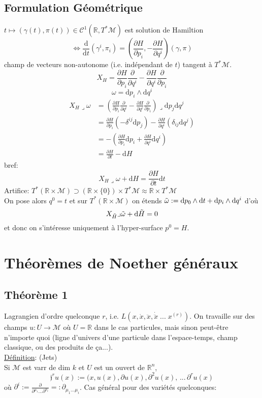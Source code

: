 \documentclass[a4paper,11pt]{article}
\renewcommand{\d}{{\mathrm{d}}}
\newcommand{\dr}[2]{\frac{\partial {#1}}{\partial{#2}}}
\begin{document}
\subsection{Formulation Géométrique}
$t\mapsto (\gamma(t), \pi(t)) \in \mathcal{C}^1(\mathbb{R},T^*\mathcal{M})$ est solution de Hamiltion
$$\iff \frac{\d}{\d t}(\gamma^i, \pi_i) = (\dr H{p_i},-\dr H{q^i})(\gamma,\pi)$$
champ de vecteurs \color{red} non-autonome (i.e. indépendant de $t$) \color{black} tangent à $T^*\mathcal{M}$.
$$X_H = \dr H{p_i} \dr{}{q^i}-\dr H{q^i}\dr{}{p_i}$$
$$\omega = \d p_i \wedge \d q^i$$
\begin{align*}
X_H \lrcorner \omega
&= \left(\dr H{p_i} \dr{}{q^i}-\dr H{q^i}\dr{}{p_i}\right) \lrcorner \d p_j\d q^j\\
&= \dr H {p_i} (-\delta^{ij} \d p_j) - \dr H {q^i}(\delta_{ij}\d q^j)\\
&= - \left(\dr H {p_i} \d p_i + \dr H {q^i} \d q^i\right)\\
&=\dr H t - \d H
\end{align*}
bref:
$$\boxed{X_H \lrcorner \omega + \d H = \dr H t \d t}$$
Artifice: $T^*(\mathbb{R}\times\mathcal{M}) \supset (\mathbb{R}\times\{0\})\times T^*\mathcal{M}\approx\mathbb{R}\times T^*\mathcal{M} $
\\
On pose alors $q^0 = t$ et sur $T^*(\mathbb{R}\times\mathcal{M})$ on étends $\Tilde \omega:= \d p_0 \wedge \d t + \d p_i \wedge \d q^i$ d'où
$$X_{\Tilde H} \lrcorner \Tilde \omega + \d \Tilde H=0$$
et donc on s'intéresse uniquement à l'hyper-surface $p^0 = H$.

\section{Théorèmes de Noether généraux}
\subsection{Théorème 1}
Lagrangien d'ordre quelconque $r$, i.e. $L(x, \dot x, \ddot x, \dot{\ddot x}\;...\; x^{(r)})$. On travaille sur des champs $u:U\to\mathcal{M}$ où $U=\mathbb{R}$ dans le cas particules, mais sinon peut-être n'importe quoi (ligne d'univers d'une particule dans l'espace-temps, champ classique, ou des produits de ça...).
\\
\underline{Définition}: (Jets)\\
Si $\mathcal{M}$ est varr de dim $k$ et $U$ est un ouvert de $\mathbb{R}^n$, 
$$\mathfrak{j}^r u (x) := (x, u(x), \partial u(x), \partial^2 u(x), \,...\, \partial^r u (x)$$
où $\partial^i := \dr{}{^{\mu_1}...\partial^{\mu_i}} =: \partial_{\mu_1...\mu_i}$. 
Cas général pour des variétés quelconques:
\end{document}
